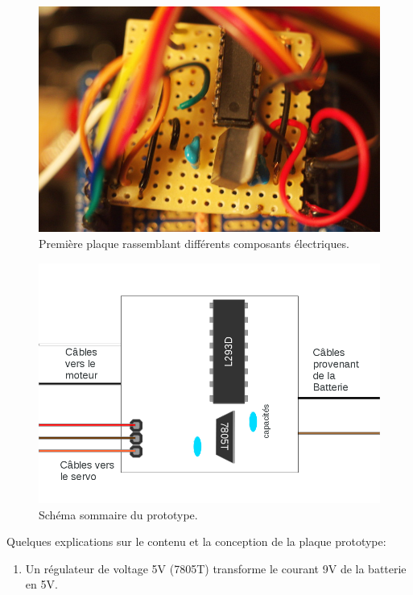 \documentclass[a4paper,11pt]{report}
\begin{document}
{\begin{figure}[h]
\centering
\includegraphics[width=1.0\textwidth]{figures/DSC_1116res}
    \caption[Prototype du PCB]{\label{PPFigure}Première plaque rassemblant différents composants électriques. 
    }
\end{figure}
 
\begin{figure}[h]
\centering
\includegraphics[width=1.0\textwidth]{figures/SchemaPlaqueMaison}
    \caption{\label{SchemaPlaqueMaison}Schéma sommaire du prototype.
    }
\end{figure}

Quelques explications sur le contenu et la conception de la plaque prototype:

\begin{enumerate}
	\item Un régulateur de voltage 5V (7805T) transforme le courant 9V de
          la batterie en 5V. 


\end{enumerate}}
\end{document}
